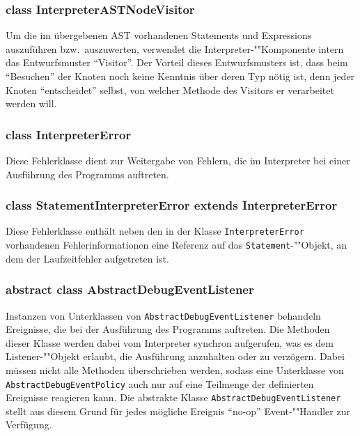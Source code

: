 \subsubsection{class InterpreterASTNodeVisitor}
Um die im übergebenen AST vorhandenen Statements und Expressions auszuführen bzw.\ auszuwerten, verwendet die Interpreter-""Komponente intern das Entwurfsmuster ``Visitor''. Der Vorteil dieses Entwurfsmusters ist, dass beim ``Besuchen'' der Knoten noch keine Kenntnis über deren Typ nötig ist, denn jeder Knoten ``entscheidet'' selbst, von welcher Methode des Visitors er verarbeitet werden will.

\subsubsection{class InterpreterError}
Diese Fehlerklasse dient zur Weitergabe von Fehlern, die im Interpreter bei einer Ausführung des Programms auftreten.

\subsubsection{class StatementInterpreterError extends InterpreterError}
Diese Fehlerklasse enthält neben den in der Klasse \texttt{InterpreterError} vorhandenen Fehlerinformationen eine Referenz auf das \texttt{Statement}-""Objekt, an dem der Laufzeitfehler aufgetreten ist.

\subsubsection{abstract class AbstractDebugEventListener}
Instanzen von Unterklassen von \texttt{AbstractDebugEventListener} behandeln Ereignisse, die bei der Ausführung des Programms auftreten. Die Methoden dieser Klasse werden dabei vom Interpreter synchron aufgerufen, was es dem Listener-""Objekt erlaubt, die Ausführung anzuhalten oder zu verzögern. Dabei müssen nicht alle Methoden überschrieben werden, sodass eine Unterklasse von \texttt{AbstractDebugEventPolicy} auch nur auf eine Teilmenge der definierten Ereignisse reagieren kann. Die abstrakte Klasse \texttt{AbstractDebugEventListener} stellt aus diesem Grund für jedes mögliche Ereignis ``no-op'' Event-""Handler zur Verfügung.


